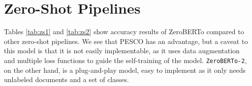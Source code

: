 \documentclass[]{politex-xico}
\begin{document}
\begin{table}[]
\caption{Results of comparing to few-shot models.}
\label{fs-results}
\end{table}


\section{Zero-Shot Pipelines}

Tables \ref{tab:zs1} and \ref{tab:zs2} show accuracy results of ZeroBERTo compared to other zero-shot pipelines. We see that PESCO has an advantage, but a caveat to this model is that it is not easily implementable, as it uses data augmentation and multiple loss functions to guide the self-training of the model. \texttt{ZeroBERTo-2}, on the other hand, is a plug-and-play model, easy to implement as it only needs unlabeled documents and a set of classes. 
\end{document}
